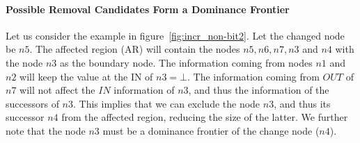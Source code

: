 \documentclass[11pt,a4paper,openright]{report}
\begin{document}
\paragraph{Possible Removal Candidates Form a Dominance Frontier}
Let us consider the example in figure~\ref{fig:incr_non-bit2}.
Let the changed node be $n5$. The affected region (AR) will contain the nodes $n5, n6, n7, n3$ and $n4$ with the node 
 $n3$ as the boundary node. The information coming from nodes $n1$ and $n2$ will keep the value at the IN of $n3 = \bot$.
The information coming from $OUT$ of $n7$ will not affect the $IN$ information of $n3$, and thus the information of the successors of $n3$.
This implies that we can exclude the node $n3$, and thus its successor $n4$ from the affected region, reducing the size of the latter.
We further note that the node $n3$ must be a dominance frontier of the change node ($n4$).
\end{document}
